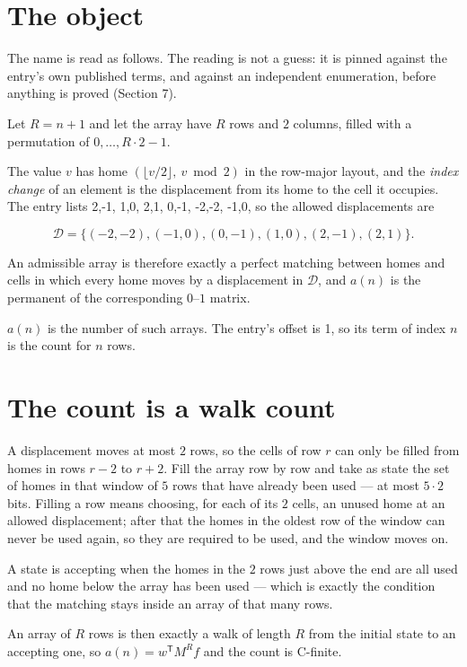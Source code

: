 \documentclass[11pt]{article}
\theoremstyle{definition}
\begin{document}
\section{The object}

The name is read as follows. The reading is not a guess: it is pinned against the entry's own published terms, and against an independent enumeration, before anything is proved (Section 7).

Let $R = n + 1$ and let the array have $R$ rows and $2$ columns, filled with a permutation of $0,\dots,R\cdot2-1$.

The value $v$ has home $(\lfloor v/2\rfloor,\ v \bmod 2)$ in the row-major layout, and the {\itshape index change} of an element is the displacement from its home to the cell it occupies. The entry lists 2,-1, 1,0, 2,1, 0,-1, -2,-2, -1,0, so the allowed displacements are

\[\mathcal{D} = \{(-2,-2), (-1,0), (0,-1), (1,0), (2,-1), (2,1)\}.\]

An admissible array is therefore exactly a perfect matching between homes and cells in which every home moves by a displacement in $\mathcal{D}$, and $a(n)$ is the permanent of the corresponding $0$--$1$ matrix.

$a(n)$ is the number of such arrays. The entry's offset is 1, so its term of index $n$ is the count for $n$ rows.

\section{The count is a walk count}

A displacement moves at most $2$ rows, so the cells of row $r$ can only be filled from homes in rows $r-2$ to $r+2$. Fill the array row by row and take as state the set of homes in that window of $5$ rows that have already been used --- at most $5\cdot2$ bits. Filling a row means choosing, for each of its $2$ cells, an unused home at an allowed displacement; after that the homes in the oldest row of the window can never be used again, so they are required to be used, and the window moves on.

A state is accepting when the homes in the $2$ rows just above the end are all used and no home below the array has been used --- which is exactly the condition that the matching stays inside an array of that many rows.

An array of $R$ rows is then exactly a walk of length $R$ from the initial state to an accepting one, so $a(n) = w^{\mathsf T}M^{R}f$ and the count is C-finite.
\end{document}
